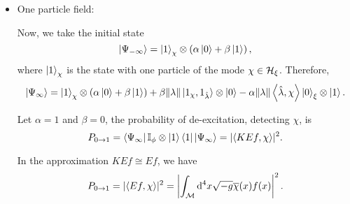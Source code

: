 \begin{itemize}
    \item One particle field:
    
    Now, we take the initial state
    \begin{equation}
        \ket{\Psi_{-\infty}}=\ket{1}_{\chi}\otimes\left(\alpha\ket{0}+\beta\ket{1}\right),
    \end{equation}
    where \(\ket{1}_\chi\) is the state with one particle of the mode \(\chi\in{\mathcal{H}}_\xi\). Therefore,
    \begin{equation}
        \ket{\Psi_\infty}=\ket{1}_\chi\otimes\left(\alpha\ket{0}+\beta\ket{1}\right)+\beta\lVert\lambda\rVert\ket{1_\chi,1_{\hat{\lambda}}}\otimes\ket{0}-\alpha\lVert\lambda\rVert\left\langle \hat{\lambda}, \chi\right\rangle\ket{0}_\xi\otimes\ket{1}.
    \end{equation}

    Let \(\alpha=1\) and \(\beta=0\), the probability of de-excitation, detecting \(\chi\), is
    \begin{equation}
        P_{0\to1}=\bra{\Psi_{\infty}}{\mathbb{I}}_{\phi}\otimes\ket{1}\bra{1}\ket{\Psi_\infty}=\lvert\left\langle KEf, \chi\right\rangle\rvert^2.
    \end{equation}

    In the approximation \(KEf\cong Ef\), we have
    \begin{equation}
        P_{0\to1}=\lvert\left\langle Ef, \chi\right\rangle\rvert^2=\left\lvert\int_{{\mathcal{M}}}\mathrm{d}^4x\sqrt{-g}\overline{\chi}(x)f(x)\right\rvert^2.
    \end{equation}
\end{itemize}